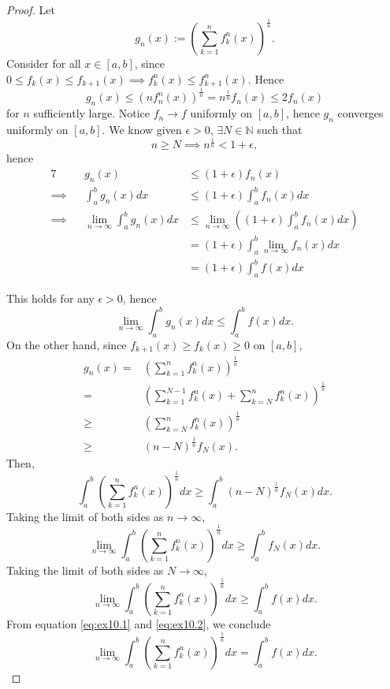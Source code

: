 \begin{Exercise}
\begin{proof}
Let $$g_n(x) := \left( \sum_{k=1}^{n} f_k^n(x) \right)^\frac{1}{n}.$$
Consider for all $x\in[a,b]$, since $0 \leq f_k(x) \leq f_{k+1}(x) \implies f_k^n(x) \leq f_{k+1}^{n}(x)$. 
Hence
$$g_n(x) \leq \left( nf_n^n(x) \right)^\frac{1}{n} = n^{\frac{1}{n}}f_n(x) \leq 2f_n(x)$$ for $n$ sufficiently large.
Notice $f_n\to f$ uniformly on $[a,b]$, hence $g_n$ converges uniformly on $[a,b]$.
We know given $\epsilon > 0$, $\exists N\in\mathbb{N}$ such that $$n\geq N \implies n^{\frac{1}{n}} < 1+\epsilon,$$ hence
\begin{alignat*}{7}
&& g_n(x) &\leq (1+\epsilon)f_n(x) \\
\implies&& \int_{a}^{b} g_n(x) d x &\leq (1+\epsilon)\int_{a}^{b}f_n(x) d x \\
\implies&& \lim_{n\to\infty} \int_{a}^{b} g_n(x) d x &\leq \lim_{n\to\infty}\left( (1+\epsilon)\int_{a}^{b}f_n(x) d x \right) \\
\quad&& &= (1+\epsilon)\int_{a}^{b}\lim_{n\to\infty}f_n(x) d x \\
\quad&& &= (1+\epsilon)\int_{a}^{b}f(x) d x
\end{alignat*}

This holds for any $\epsilon>0$, hence
\begin{equation}\label{eq:ex10.1}
\lim_{n\to\infty} \int_{a}^{b} g_n(x) d x \leq \int_{a}^{b} f(x) d x.
\end{equation}
On the other hand, since $f_{k+1}(x) \geq f_k(x) \geq 0$ on $[a,b]$,
\begin{align*}
g_n(x)
=& \left( \sum_{k=1}^{n} f_k^n(x) \right)^{\frac{1}{n}} \\
=& \left( \sum_{k=1}^{N-1}f_k^n(x) + \sum_{k=N}^{n}f_k^n(x) \right)^{\frac{1}{n}} \\
\geq& \left( \sum_{k=N}^{n}f_k^n(x) \right)^{\frac{1}{n}} \\
\geq& (n-N)^{\frac{1}{n}} f_N(x).
\end{align*}
Then, $$\int_{a}^{b} \left( \sum_{k=1}^{n} f_k^n(x) \right)^{\frac{1}{n}} dx \geq \int_{a}^{b} (n-N)^{\frac{1}{n}} f_N(x) dx.$$
Taking the limit of both sides as $n\to\infty$,
$$ \lim_{n\to\infty} \int_{a}^{b} \left( \sum_{k=1}^{n} f_k^n(x) \right)^{\frac{1}{n}} dx \geq \int_{a}^{b} f_N(x) dx.$$
Taking the limit of both sides as $N\to\infty$, 
\begin{equation}\label{eq:ex10.2}
\lim_{n\to\infty} \int_{a}^{b} \left( \sum_{k=1}^{n} f_k^n(x) \right)^{\frac{1}{n}} dx \geq \int_{a}^{b} f(x) dx.
\end{equation}
From equation \eqref{eq:ex10.1} and \eqref{eq:ex10.2}, we conclude $$
\lim_{n\to\infty} \int_{a}^{b} \left( \sum_{k=1}^{n} f_k^n(x) \right)^{\frac{1}{n}} dx = \int_{a}^{b} f(x) dx.$$
\end{proof}
\end{Exercise}